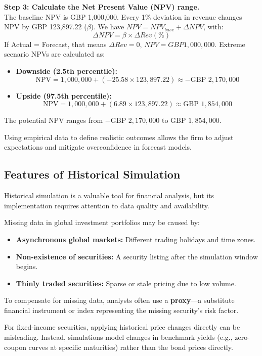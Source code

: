 \begin{tcolorbox}
\textbf{Step 3: Calculate the Net Present Value (NPV) range.} \\
The baseline NPV is GBP 1,000,000. Every 1\% deviation in revenue changes NPV by GBP 123,897.22 ($\beta$). 
We have $NPV = NPV_{base} + \Delta NPV$, with:
\[
\Delta NPV = \beta \times \Delta Rev (\%)
\]
If Actual = Forecast, that means $\Delta Rev = 0$, $NPV = GBP 1,000,000$. Extreme scenario NPVs are calculated as:


\begin{itemize}
	\item \textbf{Downside (2.5th percentile):}
	\[
	\text{NPV} = 1,000,000 + (-25.58 \times 123,897.22) \approx -\text{GBP } 2,170,000
	\]
	\item \textbf{Upside (97.5th percentile):}
	\[
	\text{NPV} = 1,000,000 + (6.89 \times 123,897.22) \approx \text{GBP } 1,854,000
	\]
\end{itemize}
The potential NPV ranges from $-\text{GBP } 2,170,000$ to $\text{GBP } 1,854,000$.

Using empirical data to define realistic outcomes allows the firm to adjust expectations and mitigate overconfidence in forecast models.
\end{tcolorbox}

\subsection{Features of Historical Simulation}
Historical simulation is a valuable tool for financial analysis, but its implementation requires attention to data quality and availability.

Missing data in global investment portfolios may be caused by:
\begin{itemize}
	\item \textbf{Asynchronous global markets:} Different trading holidays and time zones.
	\item \textbf{Non-existence of securities:} A security listing after the simulation window begins.
	\item \textbf{Thinly traded securities:} Sparse or stale pricing due to low volume.
\end{itemize}
To compensate for missing data, analysts often use a \textbf{proxy}—a substitute financial instrument or index representing the missing security's risk factor.

For fixed-income securities, applying historical price changes directly can be misleading. Instead, simulations model changes in benchmark yields (e.g., zero-coupon curves at specific maturities) rather than the bond prices directly.

